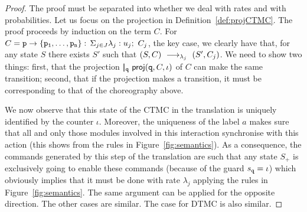 \begin{proof} The proof must be separated into whether we deal with
  rates and with probabilities. Let us focus on the projection in
  Definition~\ref{def:projCTMC}. The proof proceeds by induction on
  the term $C$. For $C=\mathtt{p}\rightarrow \{\mathtt{\mathtt{p}_1,\ldots,\mathtt{p}_n}\}:\,\Sigma_{j\in J}\lambda_j: u_j;\ C_j$, the
  key case, we clearly have that, for any state $S$ there exists $S'$
  such that $(S,C)\ \longrightarrow_{\lambda_j}\ (S',C_j)$. We need to show two
  things: first, that the projection
  $|\!|_{\mathtt{q}}\ \mathsf{proj}{(\mathtt{q},C,\iota)}$ of $C$ can make the same
  transition; second, that if the projection makes a transition, it
  must be corresponding to that of the choreography above.

  We now observe that this state of the CTMC in the translation is
  uniquely identified by the counter $\iota$. 
  Moreover, the uniqueness of the label $a$ makes sure that all and
  only those modules involved in this interaction synchronise with
  this action (this shows from the rules in
  Figure~\ref{fig:semantics}).  As a consequence, the commands
  generated by this step of the translation are such that any state
  $S_+$ is exclusively going to enable these commands (because of the
  guard $s_{\mathtt{q}}=\iota$) which obviously implies that it must be
  done with rate $\lambda_j$ applying the rules in
  Figure~\ref{fig:semantics}. The same argument can be applied for the
  opposite direction. 
  The other cases are similar. The case for DTMC is also similar.






\end{proof}
